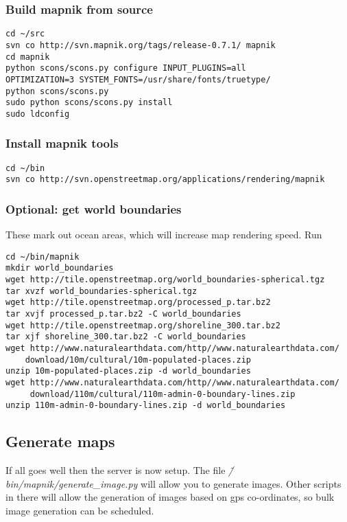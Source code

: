 \subsubsection{Build mapnik from source}

\begin{verbatim}
cd ~/src
svn co http://svn.mapnik.org/tags/release-0.7.1/ mapnik
cd mapnik
python scons/scons.py configure INPUT_PLUGINS=all 
OPTIMIZATION=3 SYSTEM_FONTS=/usr/share/fonts/truetype/
python scons/scons.py
sudo python scons/scons.py install
sudo ldconfig
\end{verbatim}

\subsubsection{Install mapnik tools}

\begin{verbatim}
cd ~/bin
svn co http://svn.openstreetmap.org/applications/rendering/mapnik
\end{verbatim}

\subsubsection{Optional: get world boundaries}

These mark out ocean areas, which will increase map rendering speed. Run

\begin{verbatim}
cd ~/bin/mapnik
mkdir world_boundaries
wget http://tile.openstreetmap.org/world_boundaries-spherical.tgz
tar xvzf world_boundaries-spherical.tgz
wget http://tile.openstreetmap.org/processed_p.tar.bz2
tar xvjf processed_p.tar.bz2 -C world_boundaries
wget http://tile.openstreetmap.org/shoreline_300.tar.bz2
tar xjf shoreline_300.tar.bz2 -C world_boundaries
wget http://www.naturalearthdata.com/http//www.naturalearthdata.com/
    download/10m/cultural/10m-populated-places.zip
unzip 10m-populated-places.zip -d world_boundaries
wget http://www.naturalearthdata.com/http//www.naturalearthdata.com/
     download/110m/cultural/110m-admin-0-boundary-lines.zip
unzip 110m-admin-0-boundary-lines.zip -d world_boundaries
\end{verbatim}

\subsection{Generate maps}

If all goes well then the server is now setup. The file \emph{\~/bin/mapnik/generate\_image.py} will allow you to generate images. Other scripts in there will allow the generation of images based on gps co-ordinates, so bulk image generation can be scheduled.



